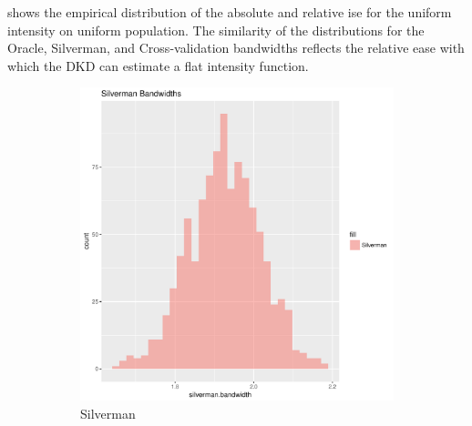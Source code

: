  shows the empirical distribution of the absolute  and relative  \gls{ise} for the uniform intensity on uniform population.
The similarity of the distributions for the Oracle, Silverman, and Cross-validation bandwidths
reflects the relative ease with which the DKD can estimate a flat intensity function.

\begin{figure}[htbp]
    \centering
    \begin{subfigure}[b]{0.3\textwidth}
    \includegraphics[width=\textwidth]{results/unif_100_unif/output/bandwidths-silverman}
    \caption{Silverman}
    \label{fig:bandwidths_x1:unif_100_unif:s}
    \end{subfigure}
    \begin{subfigure}[b]{0.3\textwidth}

\end{subfigure}
\end{figure}
